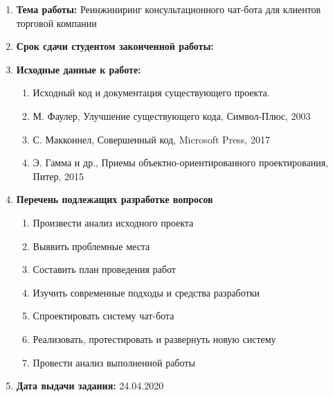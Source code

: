 \begin{titlepage}
    \begin{enumerate}
        \item \textbf{Тема работы:} Реинжиниринг консультационного чат-бота для клиентов торговой компании
        \item \textbf{Срок сдачи студентом законченной работы:}
        \item \textbf{Исходные данные к работе:}
        \begin{enumerate}
            \item Исходный код и документация существующего проекта.
            \item М. Фаулер, Улучшение существующего кода, Символ-Плюс, 2003
            \item С. Макконнел, Совершенный код, Microsoft Press, 2017
            \item Э. Гамма и др., Приемы объектно-ориентированного проектирования, Питер, 2015 
        \end{enumerate}
        \item \textbf{Перечень подлежащих разработке вопросов}
        \begin{enumerate}
            \item Произвести анализ исходного проекта
            \item Выявить проблемные места
            \item Составить план проведения работ
            \item Изучить современные подходы и средства разработки
            \item Спроектировать систему чат-бота
            \item Реализовать, протестировать и развернуть новую систему
            \item Провести анализ выполненной работы
        \end{enumerate}
        \item \textbf{Дата выдачи задания:} 24.04.2020
    \end{enumerate}

\end{titlepage}
